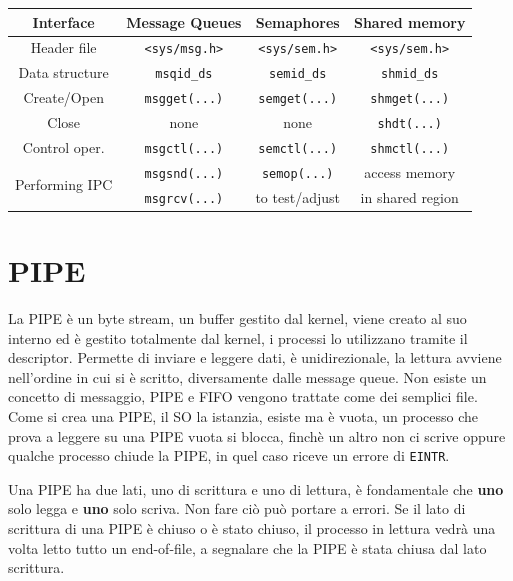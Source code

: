 \documentclass[a4paper, 12pt]{book}
\begin{document}
    \begin{center}
        \begin{tabular}{|c|c|c|c|}
            \hline 
            Interface & Message Queues & Semaphores & Shared memory \\
            \hline 
            Header file & \verb|<sys/msg.h>| & \verb|<sys/sem.h>| & \verb|<sys/sem.h>| \\
            Data structure & \verb|msqid_ds| & \verb|semid_ds| & \verb|shmid_ds| \\
            Create/Open & \verb|msgget(...)| & \verb|semget(...)| & \verb|shmget(...)| \\
            Close & none & none & \verb|shdt(...)| \\
            Control oper. & \verb|msgctl(...)| & \verb|semctl(...)| & \verb|shmctl(...)| \\
            \multirow{2}{4em}{Performing IPC} & \verb|msgsnd(...)| & \verb|semop(...)| & access memory \\
            & \verb|msgrcv(...)| & to test/adjust & in shared region \\
            \hline
        \end{tabular}    
    \end{center}

    \section{PIPE}

    La PIPE è un byte stream, un buffer gestito dal kernel,
    viene creato al suo interno ed è gestito totalmente 
    dal kernel, i processi lo utilizzano tramite il descriptor.
    Permette di inviare e leggere dati, è unidirezionale, 
    la lettura avviene nell'ordine in cui si è scritto, diversamente 
    dalle message queue. Non esiste un concetto di messaggio,
    PIPE e FIFO vengono trattate come dei semplici file.
    Come si crea una PIPE, il SO la istanzia, esiste ma è
    vuota, un processo che prova a leggere su una PIPE vuota 
    si blocca, finchè un altro non ci scrive oppure 
    qualche processo chiude la PIPE, in quel caso riceve 
    un errore di \verb|EINTR|. 
    
    Una PIPE ha due lati, uno di scrittura e uno di lettura, 
    è fondamentale che \textbf{uno} solo legga e 
    \textbf{uno} solo scriva. Non fare ciò può portare a 
    errori. Se il lato di scrittura di una PIPE è chiuso 
    o è stato chiuso, il processo in lettura vedrà una 
    volta letto tutto un end-of-file, a segnalare 
    che la PIPE è stata chiusa dal lato scrittura.
\end{document}
